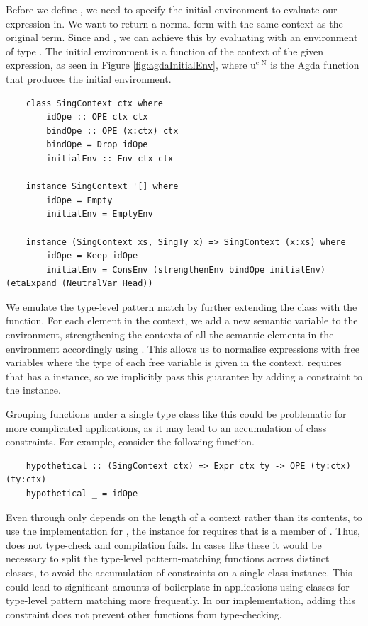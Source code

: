 Before we define , we need to specify the initial environment to evaluate our expression in. We want  to return a normal form with the same context as the original term. Since  and , we can achieve this by evaluating with an environment of type . The initial environment is a function of the context of the given expression, as seen in Figure \ref{fig:agdaInitialEnv}, where $\text{u}^\text{c N}$ is the Agda function that produces the initial environment.

\begin{lstlisting}
    class SingContext ctx where
        idOpe :: OPE ctx ctx
        bindOpe :: OPE (x:ctx) ctx
        bindOpe = Drop idOpe
        initialEnv :: Env ctx ctx

    instance SingContext '[] where
        idOpe = Empty
        initialEnv = EmptyEnv

    instance (SingContext xs, SingTy x) => SingContext (x:xs) where
        idOpe = Keep idOpe
        initialEnv = ConsEnv (strengthenEnv bindOpe initialEnv) (etaExpand (NeutralVar Head))
\end{lstlisting}

We emulate the type-level pattern match by further extending the  class with the  function. 
For each element in the context, we add a new semantic variable to the environment, strengthening the contexts of all the semantic elements in the environment accordingly using . This allows us to normalise expressions with free variables where the type of each free variable is given in the context.  requires that  has a  instance, so we implicitly pass this guarantee by adding a  constraint to the instance. 

Grouping functions under a single type class like this could be problematic for more complicated applications, as it may lead to an accumulation of class constraints. For example, consider the following  function.

\begin{lstlisting}
    hypothetical :: (SingContext ctx) => Expr ctx ty -> OPE (ty:ctx) (ty:ctx)
    hypothetical _ = idOpe
\end{lstlisting}

Even through  only depends on the length of a context rather than its contents, to use the  implementation for , the \code{(:)} instance for  requires that  is a member of . Thus,  does not type-check and compilation fails. In cases like these it would be necessary to split the type-level pattern-matching functions across distinct classes, to avoid the accumulation of constraints on a single class instance. This could lead to significant amounts of boilerplate in applications using classes for type-level pattern matching more frequently. In our implementation, adding this constraint does not prevent other functions from type-checking. 

